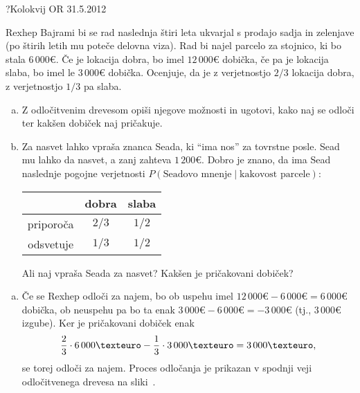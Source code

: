 \begin{naloga}{?}{Kolokvij OR 31.5.2012}
\begin{vprasanje}
Rexhep Bajrami bi se rad naslednja štiri leta
ukvarjal s prodajo sadja in zelenjave
(po štirih letih mu poteče delovna viza).
Rad bi najel parcelo za stojnico, ki bo stala $6\,000 €$.
Če je lokacija dobra, bo imel $12\,000 €$ dobička,
če pa je lokacija slaba, bo imel le $3\,000 €$ dobička.
Ocenjuje, da je z verjetnostjo $2/3$ lokacija dobra,
z verjetnostjo $1/3$ pa slaba.
\begin{enumerate}[(a)]
\item Z odločitvenim drevesom opiši njegove možnosti in ugotovi,
kako naj se odloči ter kakšen dobiček naj pričakuje.
\item Za nasvet lahko vpraša znanca Seada, ki ``ima nos'' za tovrstne posle.
Sead mu lahko da nasvet, a zanj zahteva $1\,200 €$.
Dobro je znano, da ima Sead naslednje pogojne verjetnosti
$P(\text{Seadovo mnenje} \; | \; \text{kakovost parcele})$:
\begin{center}
\begin{tabular}{c|cc}
& dobra & slaba \\
\hline
priporoča & $2/3$ & $1/2$ \\
odsvetuje & $1/3$ & $1/2$
\end{tabular}
\end{center}
Ali naj vpraša Seada za nasvet?
Kakšen je pričakovani dobiček?
\end{enumerate}
\end{vprasanje}

\begin{odgovor}
\begin{enumerate}[(a)]
\item Če se Rexhep odloči za najem,
bo ob uspehu imel $12\,000 € - 6\,000 € = 6\,000 €$ dobička,
ob neuspehu pa bo ta enak $3\,000 € - 6\,000 € = -3\,000 €$
(tj., $3\,000 €$ izgube).
Ker je pričakovani dobiček enak
$$
{2 \over 3} \cdot 6\,000 € - {1 \over 3} \cdot 3\,000 € = 3\,000 € ,
$$
se torej odloči za najem.
Proces odločanja je prikazan
v spodnji veji od\-lo\-čit\-ve\-ne\-ga drevesa na sliki~\fig.


\end{enumerate}
\end{odgovor}
\end{naloga}
